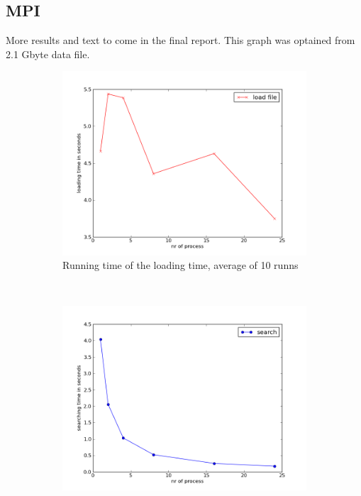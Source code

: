 \documentclass[a4paper,10pt]{article}
\begin{document}
\subsection{MPI}
  More results and text to come in the final report.  This graph was optained from 2.1 Gbyte data file.
  
\begin{figure}[h!]
        \centering
        \begin{subfigure}[b]{0.48\textwidth}
                \centering
                \includegraphics[width=\textwidth]{graphics/mpio_load_data.png}
                \caption{Running time of the loading time, average of 10 runns}
                \label{fig:gull}
        \end{subfigure}%
\\
        \begin{subfigure}[b]{0.48\textwidth}
                \centering
                \includegraphics[width=\textwidth]{graphics/mpio_searching_time.png}

\end{subfigure}
\end{figure}
\end{document}
